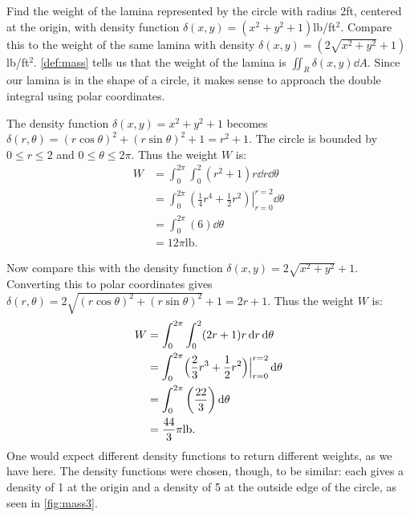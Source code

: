 %
%
\vspace{-1.3\baselineskip}%
%
\begin{example}\label{ex_mass3}%
Find the weight of the lamina represented by the circle with radius 2ft, centered at the origin, with density function $\delta(x,y) = (x^2+y^2+1)$lb/ft$^2$. Compare this to the weight of the same lamina with density $\delta(x,y) = (2\sqrt{x^2+y^2}+1)$lb/ft$^2$.
\solution
\autoref{def:mass} tells us that the weight of the lamina is $\iint_R\delta(x,y)\dd A$. Since our lamina is in the shape of a circle, it makes sense to approach the double integral using polar coordinates.

The density function $\delta(x,y) = x^2+y^2+1$ becomes $\delta(r,\theta) = (r\cos\theta)^2+(r\sin\theta)^2+1 = r^2+1$. The circle is bounded by $0\leq r\leq 2$ and $0\leq\theta\leq2\pi$. Thus the weight $W$ is:
\begin{align*}
W &= \int_0^{2\pi}\int_0^2 (r^2+1)r\dd r\dd\theta\\
	&= \int_0^{2\pi} \left.\left(\frac14r^4+\frac12r^2\right)\right|_{r=0}^{r=2}\dd\theta\\
	&= \int_0^{2\pi} \left(6\right)\dd\theta\\
	&= 12\pi %
	\text{lb}.
\end{align*}

Now compare this with the density function $\delta(x,y) = 2\sqrt{x^2+y^2}+1$. Converting this to polar coordinates gives $\delta(r,\theta) = 2\sqrt{(r\cos\theta)^2+(r\sin\theta)^2}+1 = 2r+1$. Thus the weight $W$ is:
\begin{align*}
W &= \int_0^{2\pi}\int_0^2 (2r+1)r\dd r\dd\theta\\
	&= \int_0^{2\pi} \Bigl(\frac23r^3+\frac12r^2\Bigr)\Bigr|_{r=0}^{r=2}\dd\theta\\
	&= \int_0^{2\pi} \left(\frac{22}3\right)\dd\theta\\
	&= \frac{44}3\pi %
	\text{lb}.
\end{align*}
One would expect different density functions to return different weights, as we have here. The density functions were chosen, though, to be similar: each gives a density of 1 at the origin and a density of 5 at the outside edge of the circle, as seen in \autoref{fig:mass3}.


\end{example}
